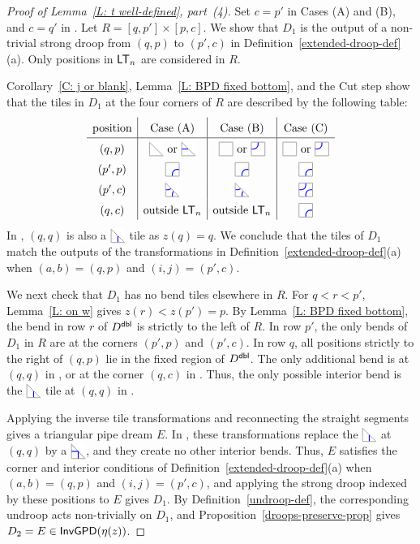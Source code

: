 \documentclass[10pt]{article}
\begin{document}
\begin{proof}[Proof of Lemma~\ref{L: t well-defined}, part~(4)]
Set $c=p'$ in Cases (A) and (B), and $c=q'$ in \CaseC.
Let $R=[q,p']\times[p,c]$.
We show that $D_1$ is the output of a non-trivial strong droop
from $(q,p)$ to $(p',c)$ in Definition~\ref{extended-droop-def}(a).
Only positions in $\mathsf{LT}_n$ are considered in $R$.

Corollary~\ref{C: j or blank}, Lemma~\ref{L: BPD fixed bottom},
and the Cut step show that the tiles in $D_1$ at the four corners of $R$ are described by the following table:
\[
\begingroup
\renewcommand{\arraystretch}{1.5}
\begin{array}{c|c|c|c}
\text{position} & \text{\CaseA} & \text{Case (B)} & \text{Case (C)} \\
\hline
(q,p) & \BDIAG\text{ or }\JDIAG & \BTILE\text{ or }\JTILE
& \BTILE\text{ or }\JTILE \\
(p',p) & \CTILE & \CTILE & \CTILE \\
(p',c) & \EDIAG & \EDIAG & \ETILE \\
(q,c) & \text{outside }\LT_n & \text{outside }\LT_n & \CTILE
\end{array}
\endgroup
\]
In \CaseB, $(q,q)$ is also a $\CDIAG$ tile as $z(q)=q$.
We conclude that the tiles of $D_1$ match the outputs of the transformations in
Definition~\ref{extended-droop-def}(a)
when $(a,b) =(q,p)$ and $(i,j) = (p',c)$.

We next check that $D_1$ has no bend tiles elsewhere in $R$.
For $q<r<p'$, Lemma~\ref{L: on w} gives $z(r)<z(p')=p$.
By Lemma~\ref{L: BPD fixed bottom}, the bend in row $r$ of $D^{\mathsf{dbl}}$
is   strictly to the left of $R$.
In row $p'$, the only bends of $D_1$ in $R$ are at the corners
$(p',p)$ and $(p',c)$.
In row $q$, all positions strictly to the right of $(q,p)$ lie in
the fixed region of $D^{\mathsf{dbl}}$.
The only additional bend is at $(q,q)$ in \CaseB, or at the corner
$(q,c)$ in \CaseC.
Thus, the only possible interior bend is the $\CDIAG$ tile at $(q,q)$
in \CaseB.

Applying the inverse tile transformations and reconnecting the straight
segments gives a triangular pipe dream $E$.
In \CaseB, these transformations replace the $\CDIAG$ at $(q,q)$
by a $\PDIAG$, and they create no other interior bends.
Thus, $E$ satisfies the corner and interior conditions of
Definition~\ref{extended-droop-def}(a) when $(a,b) =(q,p)$ and $(i,j) = (p',c)$, and applying the strong droop indexed by these positions to $E$ gives $D_1$.
By Definition~\ref{undroop-def}, the corresponding undroop acts non-trivially on $D_1$,
and Proposition~\ref{droops-preserve-prop} gives
$D_2=E\in\mathsf{InvGPD}(\eta(z))$.
\end{proof}
\end{document}
